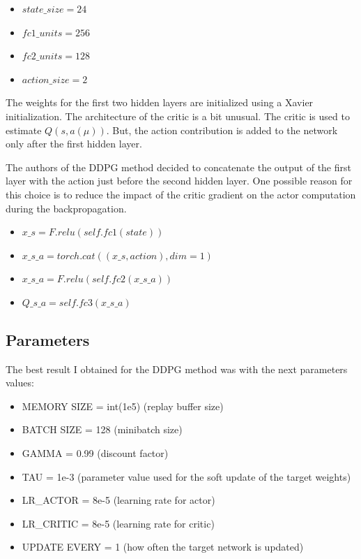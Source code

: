 \documentclass[12pt]{article}
\begin{document}
\begin{itemize}
\item $state\_size=24$
\item $fc1\_units=256$
\item $fc2\_units=128$
\item $action\_size=2$
\end{itemize}

The weights for the first two hidden layers are initialized using a Xavier initialization.
The architecture of the critic is a bit unusual. The critic is used to estimate $Q(s, a(\mu))$. But, the action contribution is added to the network only after the first hidden layer.

The authors of the DDPG method\cite{LHDWR14} decided to concatenate the output of the first layer with the action just before the second hidden layer. One possible reason for this choice is to reduce the impact of the critic gradient on the actor computation during the backpropagation.


\begin{itemize}
\item $x\_s   = F.relu(self.fc1(state))$
\item $x\_s\_a = torch.cat((x\_s, action), dim=1)$
\item $x\_s\_a = F.relu(self.fc2(x\_s\_a))$
\item $Q\_s\_a  = self.fc3(x\_s\_a)$
\end{itemize}

\subsection{Parameters}
The best result I obtained for the DDPG method was with the next parameters values:

\begin{itemize}
\item MEMORY SIZE = int(1e5) (replay buffer size)
\item BATCH SIZE = 128  (minibatch size)
\item GAMMA = 0.99  (discount factor)
\item TAU = 1e-3  (parameter value used for the soft update of the target weights)
\item LR\_ACTOR = 8e-5  (learning rate for actor)
\item LR\_CRITIC = 8e-5  (learning rate for critic)
\item UPDATE EVERY = 1  (how often the target network is updated)
\end{itemize}
\end{document}
